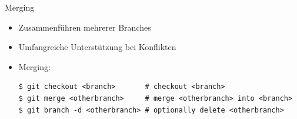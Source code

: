 \begin{frame}{Merging}
  \begin{itemize}
    \item Zusammenführen mehrerer Branches
    \item Umfangreiche Unterstützung bei Konflikten
    \item Merging:
    \begin{lstlisting}
$ git checkout <branch>       # checkout <branch>
$ git merge <otherbranch>     # merge <otherbranch> into <branch>
$ git branch -d <otherbranch> # optionally delete <otherbranch>
    \end{lstlisting}
  \end{itemize}
\end{frame}



